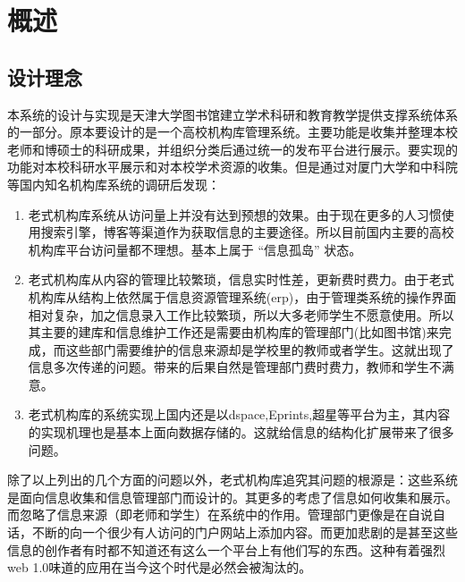 
\chapter{概述}
\label{chap:intro}

\section{设计理念}
\label{sec:dongji}

本系统的设计与实现是天津大学图书馆建立学术科研和教育教学提供支撑系统体系的一部分。原本要设计的是一个高校机构库管理系统。主要功能是收集并整理本校老师和博硕士的科研成果，并组织分类后通过统一的发布平台进行展示。要实现的功能对本校科研水平展示和对本校学术资源的收集。但是通过对厦门大学和中科院等国内知名机构库系统的调研后发现：
\begin{enumerate}
\item 老式机构库系统从访问量上并没有达到预想的效果。由于现在更多的人习惯使用搜索引擎，博客等渠道作为获取信息的主要途径。所以目前国内主要的高校机构库平台访问量都不理想。基本上属于 “信息孤岛” 状态。
\item 老式机构库从内容的管理比较繁琐，信息实时性差，更新费时费力。由于老式机构库从结构上依然属于信息资源管理系统(erp)，由于管理类系统的操作界面相对复杂，加之信息录入工作比较繁琐，所以大多老师学生不愿意使用。所以其主要的建库和信息维护工作还是需要由机构库的管理部门(比如图书馆)来完成，而这些部门需要维护的信息来源却是学校里的教师或者学生。这就出现了信息多次传递的问题。带来的后果自然是管理部门费时费力，教师和学生不满意。
\item 老式机构库的系统实现上国内还是以dspace,Eprints,超星等平台为主，其内容的实现机理也是基本上面向数据存储的。这就给信息的结构化扩展带来了很多问题。
\end{enumerate}
除了以上列出的几个方面的问题以外，老式机构库追究其问题的根源是：这些系统是面向信息收集和信息管理部门而设计的。其更多的考虑了信息如何收集和展示。而忽略了信息来源（即老师和学生）在系统中的作用。管理部门更像是在自说自话，不断的向一个很少有人访问的门户网站上添加内容。而更加悲剧的是甚至这些信息的创作者有时都不知道还有这么一个平台上有他们写的东西。这种有着强烈web 1.0味道的应用在当今这个时代是必然会被淘汰的。

